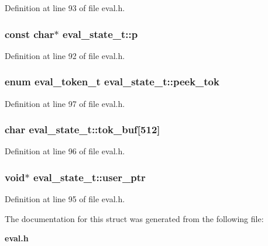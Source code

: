 Definition at line 93 of file eval.h.
\subsubsection[{p}]{\setlength{\rightskip}{0pt plus 5cm}const char$\ast$ {\bf eval\_\-state\_\-t::p}}\label{structeval__state__t_ead083444cc5eb9e824c230c7580c79e}




Definition at line 92 of file eval.h.
\subsubsection[{peek\_\-tok}]{\setlength{\rightskip}{0pt plus 5cm}enum {\bf eval\_\-token\_\-t} {\bf eval\_\-state\_\-t::peek\_\-tok}}\label{structeval__state__t_da9d83f9f249a200076fbafe1703553a}




Definition at line 97 of file eval.h.
\subsubsection[{tok\_\-buf}]{\setlength{\rightskip}{0pt plus 5cm}char {\bf eval\_\-state\_\-t::tok\_\-buf}[512]}\label{structeval__state__t_f36590d940c42b171911d00c64a8daae}




Definition at line 96 of file eval.h.
\subsubsection[{user\_\-ptr}]{\setlength{\rightskip}{0pt plus 5cm}void$\ast$ {\bf eval\_\-state\_\-t::user\_\-ptr}}\label{structeval__state__t_3db7b90eab937d764a67e0ce37485a9d}




Definition at line 95 of file eval.h.

The documentation for this struct was generated from the following file:\begin{CompactItemize}
\item 
{\bf eval.h}\end{CompactItemize}
